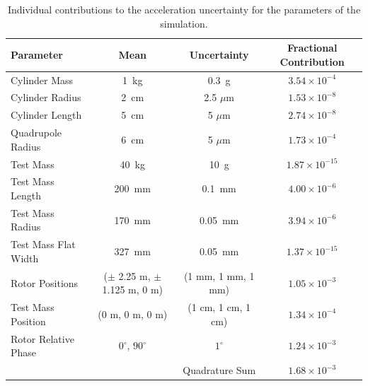 \documentclass[superscriptaddress, twocolumn, prd]{revtex4-1}
\begin{document}
\begin{widetext}
\begingroup
\setlength{\tabcolsep}{10pt} %
\renewcommand{\arraystretch}{1.5} %

\begin{table}[h!]
\begin{center}
\begin{tabular}{ |l|c|c|c| }
\hline
 Parameter & Mean & Uncertainty & Fractional Contribution\\
 \hline
Cylinder Mass & 1~kg & 0.3~g & $3.54\times10^{-4}$\\
Cylinder Radius & 2~cm & 2.5 $\mu$m & $1.53\times10^{-8}$\\
Cylinder Length & 5~cm & 5 $\mu$m & $2.74\times10^{-8}$\\
Quadrupole Radius & 6~cm & 5 $\mu$m &$1.73\times10^{-4}$\\
Test Mass & 40~kg & 10~g & $1.87\times10^{-15}$\\
Test Mass Length & 200~mm & 0.1~mm& $4.00\times10^{-6}$\\
Test Mass Radius & 170~mm & 0.05~mm& $3.94\times10^{-6}$\\
Test Mass Flat Width & 327~mm & 0.05~mm&$1.37\times10^{-15}$\\
Rotor Positions & ($\pm$ 2.25 m, $\pm$ 1.125 m, 0 m) & (1 mm, 1 mm, 1 mm) &$1.05\times10^{-3}$\\
Test Mass Position & (0 m, 0 m, 0 m) & (1 cm, 1 cm, 1 cm) &$1.34\times10^{-4}$\\
Rotor Relative Phase & $0^\circ$, $90^\circ$ & $1^\circ$ & $1.24\times10^{-3}$\\
 \hline
 \hline
& &Quadrature Sum  &$1.68\times10^{-3}$\\
\hline
 \end{tabular}
 \caption{Individual contributions to the acceleration uncertainty for the parameters of the simulation.}\label{uncert}
 \end{center}

\end{table}
\endgroup
\end{widetext}

\end{document}

